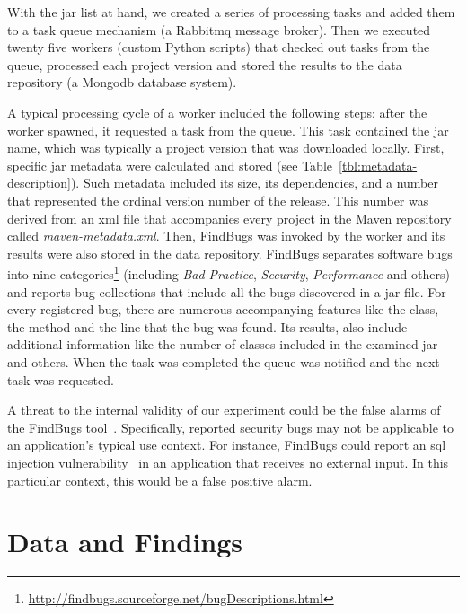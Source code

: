 \documentclass{sig-alternate}
\begin{document}
With the {\sc jar} list at hand, we created a series of processing tasks
and added them to a task queue mechanism (a Rabbit{\sc mq} message
broker). Then we executed twenty five workers (custom Python scripts)
that checked out tasks from the queue, processed each project version
and stored the results to the data
repository (a Mongo{\sc db} database system).

A typical processing cycle of a worker included the following steps: after
the worker spawned, it requested a task from the queue. This task contained
the {\sc jar} name, which was typically a project version that was downloaded locally.
First, specific {\sc jar} metadata were calculated and stored
(see Table~\ref{tbl:metadata-description}).
Such metadata included
its size, its dependencies, and a number that
represented the ordinal version number
of the release. This number was derived from an {\sc xml} file that
accompanies every project in the Maven repository called {\it
maven-metadata.xml}. Then, FindBugs was invoked by the worker and its results were
also stored in the data repository. 
FindBugs separates software bugs into nine
categories\footnote{\url{http://findbugs.sourceforge.net/bugDescriptions.html}}
(including {\it Bad Practice}, {\it Security}, {\it Performance} and others)
and reports bug collections that include all the bugs discovered in a
{\sc jar} file. For every registered bug, there are numerous accompanying features
like the class, the method and the line that the bug was found.
Its results, also include additional information like
the number of classes included in the examined {\sc jar}
and others.
When the task was completed the queue
was notified and the next task was requested.

A threat to the internal
validity of our experiment could be the false
alarms of the FindBugs tool~\cite{AP10, HP04}.
Specifically, reported security bugs may not
be applicable to an application's typical use context.
For instance, FindBugs could report an {\sc sql}
injection vulnerability~\cite{RL12}
in an application that receives no external input.
In this particular context, this would be a false
positive alarm.

\section{Data and Findings}
\label{sec:find}
\end{document}
